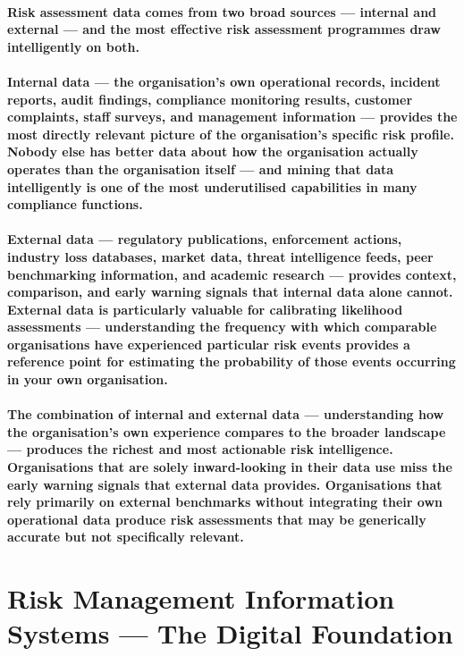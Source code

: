 \paragraph{Risk assessment data comes from two broad sources — internal and external — and the most effective risk assessment programmes draw intelligently on both.}
\paragraph{\textbf{Internal data —} the organisation's own operational records, incident reports, audit findings, compliance monitoring results, customer complaints, staff surveys, and management information — provides the most directly relevant picture of the organisation's specific risk profile. Nobody else has better data about how the organisation actually operates than the organisation itself — and mining that data intelligently is one of the most underutilised capabilities in many compliance functions.}
\paragraph{\textbf{External data} — regulatory publications, enforcement actions, industry loss databases, market data, threat intelligence feeds, peer benchmarking information, and academic research — provides context, comparison, and early warning signals that internal data alone cannot. External data is particularly valuable for calibrating likelihood assessments — understanding the frequency with which comparable organisations have experienced particular risk events provides a reference point for estimating the probability of those events occurring in your own organisation.}
\paragraph{The combination of internal and external data — understanding how the organisation's own experience compares to the broader landscape — produces the richest and most actionable risk intelligence. Organisations that are solely inward-looking in their data use miss the early warning signals that external data provides. Organisations that rely primarily on external benchmarks without integrating their own operational data produce risk assessments that may be generically accurate but not specifically relevant.}

\section{Risk Management Information Systems — The Digital Foundation}
